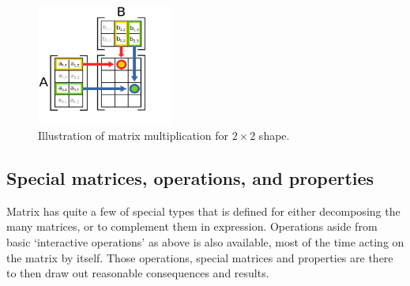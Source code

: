 \begin{figure}[htb]
    \centering
    \includegraphics[width=0.4\textwidth]{img/matmulss.png}
    \caption{Illustration of matrix multiplication for $2\times 2$ shape.}
    \label{fig:matmuls2}
\end{figure}
\subsection{Special matrices, operations, and properties}
Matrix has quite a few of special types that is defined for either decomposing the many matrices, or to complement them in expression. Operations aside from basic `interactive operations' as above is also available, most of the time acting on the matrix by itself. Those operations, special matrices and properties are there to then draw out reasonable consequences and results. 
